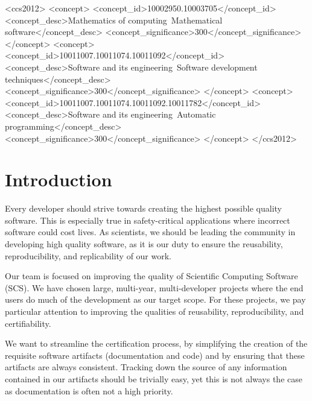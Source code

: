 \documentclass[sigconf]{acmart}
\begin{document}
%
%
 \begin{CCSXML}
<ccs2012>
<concept>
<concept_id>10002950.10003705</concept_id>
<concept_desc>Mathematics of computing~Mathematical software</concept_desc>
<concept_significance>300</concept_significance>
</concept>
<concept>
<concept_id>10011007.10011074.10011092</concept_id>
<concept_desc>Software and its engineering~Software development techniques</concept_desc>
<concept_significance>300</concept_significance>
</concept>
<concept>
<concept_id>10011007.10011074.10011092.10011782</concept_id>
<concept_desc>Software and its engineering~Automatic programming</concept_desc>
<concept_significance>300</concept_significance>
</concept>
</ccs2012>
\end{CCSXML}



\maketitle

\section{Introduction} \label{SecIntroduction}

Every developer should strive towards creating the highest possible quality 
software. This is especially true in safety-critical applications where 
incorrect software could cost lives. As scientists, we should be leading the 
community in developing high quality software, as it is our duty to ensure the 
reusability, reproducibility, and replicability of our work.

Our team is focused on improving the quality of Scientific Computing Software (SCS).
We have chosen large, multi-year, multi-developer projects where the end users
do much of the development as our target scope. For these projects, we pay
particular attention to improving the qualities of reusability, reproducibility,
and certifiability. 

We want to streamline the certification process, by simplifying the creation of 
the requisite software artifacts (documentation and code) and by ensuring that these 
artifacts are always consistent. Tracking down the source of any information 
contained in our artifacts should be trivially easy, yet this is not always the 
case as documentation is often not a high priority.
\end{document}
